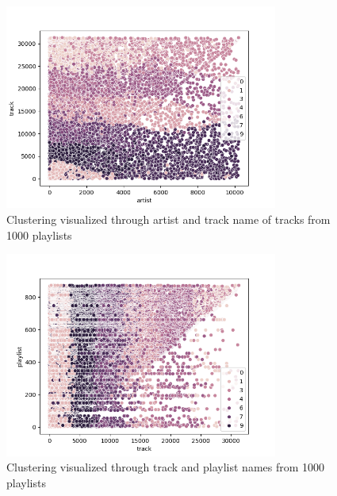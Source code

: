 \documentclass{article}
\begin{document}
\begin{figure}[htb]
    \centering
    \includegraphics[width=0.8\textwidth]{Figs/cluster-artist:track.png}
    \caption{ Clustering visualized through artist and track name of tracks from 1000 playlists}
    \label{fig:net}
\end{figure}
\begin{figure}[htb]
    \centering
    \includegraphics[width=0.8\textwidth]{Figs/cluster-track.png}
    \caption{ Clustering visualized through track and playlist names from 1000 playlists}
    \label{fig:net}
\end{figure}
\end{document}
